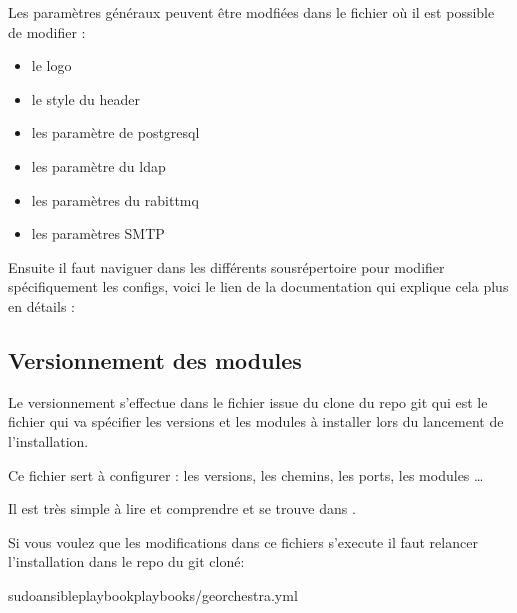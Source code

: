 \documentclass[letterpaper,10pt,french]{sphinxmanual}
\begin{document}
\sphinxAtStartPar
Les paramètres généraux peuvent être modfiées dans le fichier  où il est possible de modifier :
\begin{itemize}
\item {} 
\sphinxAtStartPar
le logo

\item {} 
\sphinxAtStartPar
le style du header

\item {} 
\sphinxAtStartPar
les paramètre de postgresql

\item {} 
\sphinxAtStartPar
les paramètre du ldap

\item {} 
\sphinxAtStartPar
les paramètres du rabittmq

\item {} 
\sphinxAtStartPar
les paramètres SMTP

\end{itemize}

\sphinxAtStartPar
Ensuite il faut naviguer dans les différents sous\sphinxhyphen{}répertoire pour modifier spécifiquement les configs, voici le lien
de la documentation qui explique cela plus en détails : 


\subsection{Versionnement des modules}
\label{\detokenize{doc_instal/configuration:versionnement-des-modules}}
\sphinxAtStartPar
Le versionnement s’effectue dans le fichier issue du clone du repo git  qui est le fichier qui va spécifier les versions et les modules à installer
lors du lancement de l’installation.

\sphinxAtStartPar
Ce fichier sert à configurer : les versions, les chemins, les ports, les modules …

\sphinxAtStartPar
Il est très simple à lire et comprendre et se trouve dans .

\sphinxAtStartPar
Si vous voulez que les modifications dans ce fichiers s’execute il faut relancer l’installation dans le repo du git cloné:

\begin{sphinxVerbatim}[commandchars=\\\{\}]
sudoansible\PYGZhy{}playbookplaybooks/georchestra.yml
\end{sphinxVerbatim}
\end{document}
